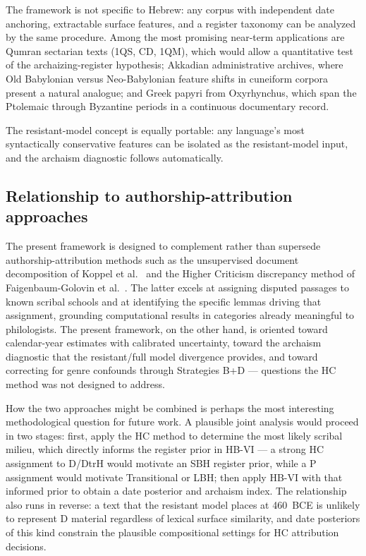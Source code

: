 \documentclass[10pt,letterpaper]{article}
\newcommand{\hbvi}{HB-VI}
\begin{document}
The framework is not specific to Hebrew: any corpus with independent date
anchoring, extractable surface features, and a register taxonomy can be
analyzed by the same procedure.  Among the most promising near-term
applications are Qumran sectarian texts (1QS, CD, 1QM), which would allow
a quantitative test of the archaizing-register hypothesis; Akkadian
administrative archives, where Old Babylonian versus Neo-Babylonian feature
shifts in cuneiform corpora present a natural analogue; and Greek papyri
from Oxyrhynchus, which span the Ptolemaic through Byzantine periods in a
continuous documentary record.

The resistant-model concept is equally portable: any language's most
syntactically conservative features can be isolated as the resistant-model
input, and the archaism diagnostic follows automatically.

\subsection*{Relationship to authorship-attribution approaches}

The present framework is designed to complement rather than supersede
authorship-attribution methods such as the unsupervised document
decomposition of Koppel et al.~\cite{Koppel2011} and the Higher Criticism
discrepancy method of Faigenbaum-Golovin et al.~\cite{Faigenbaum2025}.
The latter excels at assigning disputed passages to known scribal schools
and at identifying the specific lemmas driving that assignment, grounding
computational results in categories already meaningful to philologists.
The present framework, on the other hand, is oriented toward calendar-year
estimates with calibrated uncertainty, toward the archaism diagnostic that
the resistant/full model divergence provides, and toward correcting for
genre confounds through Strategies B+D --- questions the HC method was
not designed to address.

How the two approaches might be combined is perhaps the most interesting
methodological question for future work.  A plausible joint analysis would
proceed in two stages: first, apply the HC method to determine the most
likely scribal milieu, which directly informs the register prior in
\hbvi{} --- a strong HC assignment to D/DtrH would motivate an SBH
register prior, while a P assignment would motivate Transitional or LBH;
then apply \hbvi{} with that informed prior to obtain a date posterior and
archaism index.  The relationship also runs in reverse: a text that the
resistant model places at 460~BCE is unlikely to represent D material
regardless of lexical surface similarity, and date posteriors of this kind
constrain the plausible compositional settings for HC attribution
decisions.
\end{document}
